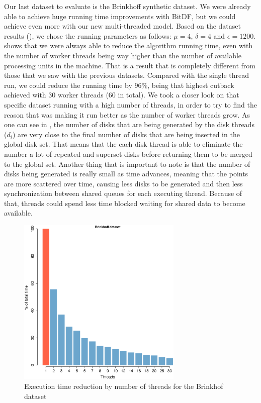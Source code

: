 {Our last dataset to evaluate is the Brinkhoff synthetic dataset. We were already able to achieve huge running time
improvements with BitDF, but we could achieve even more with our new multi-threaded model. Based on the dataset results
(), we chose the running parameters as follows: $\mu=4$, $\delta=4$ and $\epsilon=1200$.
 shows that we were always able to reduce the algorithm running time, even with the number
of worker threads being way higher than the number of available processing units in the machine. That is a result that
is completely different from those that we saw with the previous datasets. Compared with the single thread run, we could
reduce the running time by 96\%, being that highest cutback achieved with 30 worker threads (60 in total). We took a
closer look on that specific dataset running with a high number of threads, in order to try to find the reason that was
making it run better as the number of worker threads grow. As one can see in , the
number of disks that are being generated by the disk threads ($d_i$) are very close to the final number of disks that
are being inserted in the global disk set. That means that the each disk thread is able to eliminate the number a lot of
repeated and superset disks before returning them to be merged to the global set. Another thing that is important to
note is that the number of disks being generated is really small as time advances, meaning that the points are more
scattered over time, causing less disks to be generated and then less synchronization between shared queues for each
executing thread. Because of that, threads could spend less time blocked waiting for shared data to become available.

\begin{figure}[h!]
    \centering
    \includegraphics[width=0.7\textwidth]{images/Brinkhoff_thread.eps}
    \caption{Execution time reduction by number of threads for the Brinkhof dataset}
    \label{fig:brinkhoff_threads}
\end{figure}

}
